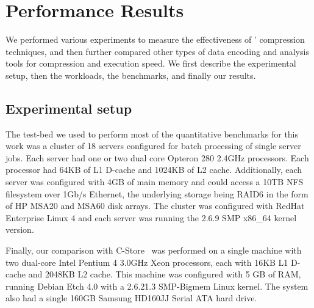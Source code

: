 \section{Performance Results}\label{sec:results}
We performed various experiments to measure the effectiveness of
\DataSeries{}' compression techniques, and then further compared other
types of data encoding and analysis tools for compression and
execution speed.  We first describe the experimental setup, then the
workloads, the benchmarks, and finally our results.

\subsection{Experimental setup}

The test-bed we used to perform most of the quantitative benchmarks for
this work was a cluster of 18 servers configured for batch processing of single server jobs.  Each server had one
or two dual core Opteron 280 2.4GHz processors.  Each processor had
64KB of L1 D-cache and 1024KB of L2 cache.  Additionally, each server
was configured with 4GB of main memory and could access a 10TB NFS
filesystem over 1Gb/s Ethernet, the underlying storage being RAID6 in
the form of HP MSA20 and MSA60 disk arrays.  The cluster was configured with
RedHat Enterprise Linux 4 and each server was running the 2.6.9 SMP
x86\_64 kernel version.  


Finally, our comparison with C-Store~\cite{Stonebraker05} was performed
on a single machine with two dual-core Intel Pentium 4
3.0GHz Xeon processors, each with 16KB L1 D-cache and 2048KB L2 cache.
This machine was configured with 5 GB of RAM, running Debian Etch 4.0
with a 2.6.21.3 SMP-Bigmem Linux kernel.  The system also had a single
160GB Samsung HD160JJ Serial ATA hard drive.

